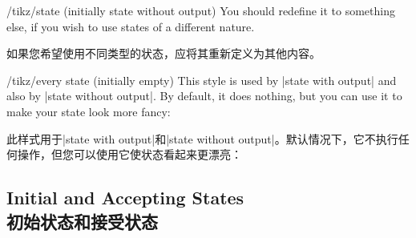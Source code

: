 \begin{stylekey}{/tikz/state (initially state without output)}
    You should redefine it to something else, if you wish to use states of a
    different nature.

    如果您希望使用不同类型的状态，应将其重新定义为其他内容。
\begin{codeexample}[preamble={\usetikzlibrary{automata}}]
\end{codeexample}
\end{stylekey}

\begin{stylekey}{/tikz/every state (initially \normalfont empty)}
    This style is used by |state with output| and also by
    |state without output|. By default, it does nothing, but you can use it to
    make your state look more fancy:
    
    此样式用于|state with output|和|state without output|。默认情况下，它不执行任何操作，但您可以使用它使状态看起来更漂亮：
\begin{codeexample}[preamble={\usetikzlibrary{arrows.meta,automata,positioning}}]
\end{codeexample}
\end{stylekey}


\subsection{Initial and Accepting States\\初始状态和接受状态}

